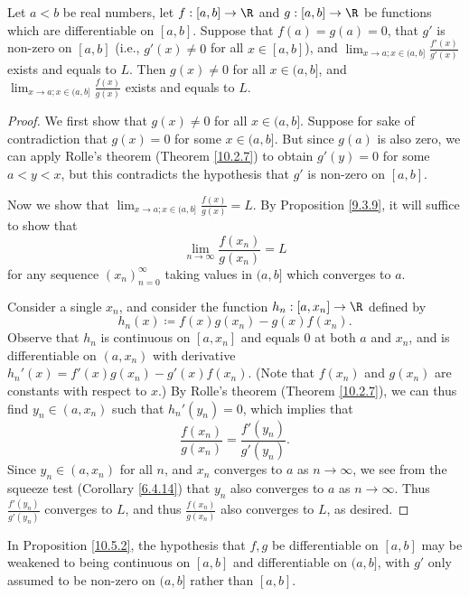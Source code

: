 \begin{proposition}\label{10.5.2}
    Let \(a < b\) be real numbers, let \(f : [a, b] \to \R\) and \(g : [a, b] \to \R\) be functions which are differentiable on \([a, b]\).
    Suppose that \(f(a) = g(a) = 0\), that \(g'\) is non-zero on \([a, b]\) (i.e., \(g'(x) \neq 0\) for all \(x \in [a, b]\)), and \(\lim_{x \to a ; x \in (a, b]} \frac{f'(x)}{g'(x)}\) exists and equals to \(L\).
    Then \(g(x) \neq 0\) for all \(x \in (a, b]\), and \(\lim_{x \to a ; x \in (a, b]} \frac{f(x)}{g(x)}\) exists and equals to \(L\).
\end{proposition}

\begin{proof}
    We first show that \(g(x) \neq 0\) for all \(x \in (a, b]\).
    Suppose for sake of contradiction that \(g(x) = 0\) for some \(x \in (a, b]\).
    But since \(g(a)\) is also zero, we can apply Rolle's theorem (Theorem \ref{10.2.7}) to obtain \(g'(y) = 0\) for some \(a < y < x\), but this contradicts the hypothesis that \(g'\) is non-zero on \([a, b]\).

    Now we show that \(\lim_{x \to a ; x \in (a, b]} \frac{f(x)}{g(x)} = L\).
    By Proposition \ref{9.3.9}, it will suffice to show that
    \[
        \lim_{n \to \infty} \frac{f(x_n)}{g(x_n)} = L
    \]
    for any sequence \((x_n)_{n = 0}^\infty\) taking values in \((a, b]\) which converges to \(a\).

    Consider a single \(x_n\), and consider the function \(h_n : [a, x_n] \to \R\) defined by
    \[
        h_n(x) \coloneqq f(x) g(x_n) - g(x) f(x_n).
    \]
    Observe that \(h_n\) is continuous on \([a, x_n]\) and equals \(0\) at both \(a\) and \(x_n\), and is differentiable on \((a, x_n)\) with derivative \(h_n'(x) = f'(x) g(x_n) - g'(x) f(x_n)\).
    (Note that \(f(x_n)\) and \(g(x_n)\) are constants with respect to \(x\).)
    By Rolle's theorem (Theorem \ref{10.2.7}), we can thus find \(y_n \in (a, x_n)\) such that \(h_n'(y_n) = 0\), which implies that
    \[
        \frac{f(x_n)}{g(x_n)} = \frac{f'(y_n)}{g'(y_n)}.
    \]
    Since \(y_n \in (a, x_n)\) for all \(n\), and \(x_n\) converges to \(a\) as \(n \to \infty\), we see from the squeeze test (Corollary \ref{6.4.14}) that \(y_n\) also converges to \(a\) as \(n \to \infty\).
    Thus \(\frac{f'(y_n)}{g'(y_n)}\) converges to \(L\), and thus \(\frac{f(x_n)}{g(x_n)}\) also converges to \(L\), as desired.
\end{proof}

\begin{note}
    In Proposition \ref{10.5.2}, the hypothesis that \(f, g\) be differentiable on \([a, b]\) may be weakened to being continuous on \([a, b]\) and differentiable on \((a, b]\), with \(g'\) only assumed to be non-zero on \((a, b]\) rather than \([a, b]\).
\end{note}

